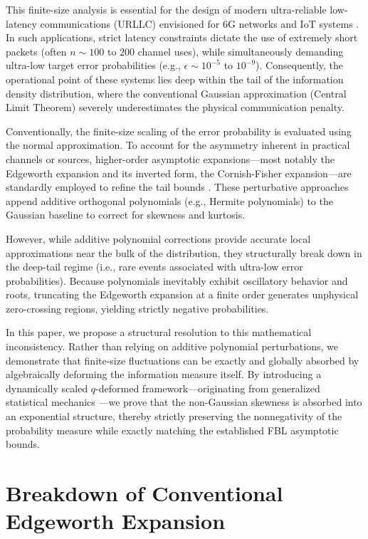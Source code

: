 \documentclass[conference]{IEEEtran}
\begin{document}
This finite-size analysis is essential for the design of modern ultra-reliable low-latency communications (URLLC) envisioned for 6G networks and IoT systems \cite{Shirvanimoghaddam2019}. In such applications, strict latency constraints dictate the use of extremely short packets (often $n \sim 100$ to $200$ channel uses), while simultaneously demanding ultra-low target error probabilities (e.g., $\epsilon \sim 10^{-5}$ to $10^{-9}$). Consequently, the operational point of these systems lies deep within the tail of the information density distribution, where the conventional Gaussian approximation (Central Limit Theorem) severely underestimates the physical communication penalty.

Conventionally, the finite-size scaling of the error probability is evaluated using the normal approximation. To account for the asymmetry inherent in practical channels or sources, higher-order asymptotic expansions---most notably the Edgeworth expansion and its inverted form, the Cornish-Fisher expansion---are standardly employed to refine the tail bounds \cite{Feller1971}. These perturbative approaches append additive orthogonal polynomials (e.g., Hermite polynomials) to the Gaussian baseline to correct for skewness and kurtosis.

However, while additive polynomial corrections provide accurate local approximations near the bulk of the distribution, they structurally break down in the deep-tail regime (i.e., rare events associated with ultra-low error probabilities). Because polynomials inevitably exhibit oscillatory behavior and roots, truncating the Edgeworth expansion at a finite order generates unphysical zero-crossing regions, yielding strictly negative probabilities.

In this paper, we propose a structural resolution to this mathematical inconsistency. Rather than relying on additive polynomial perturbations, we demonstrate that finite-size fluctuations can be exactly and globally absorbed by algebraically deforming the information measure itself. By introducing a dynamically scaled $q$-deformed framework---originating from generalized statistical mechanics \cite{Tsallis1988,Tsallis2009}---we prove that the non-Gaussian skewness is absorbed into an exponential structure, thereby strictly preserving the nonnegativity of the probability measure while exactly matching the established FBL asymptotic bounds.

\section{Breakdown of Conventional Edgeworth Expansion}
\label{sec:breakdown}
\end{document}
